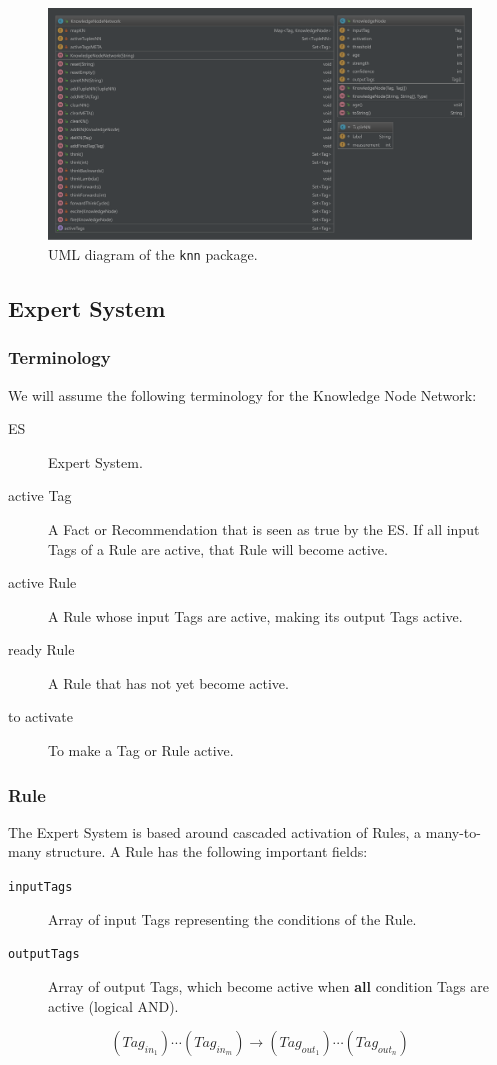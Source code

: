 \documentclass{beamer}
\newcommand{\code}[1]{\texttt{#1}}
\begin{document}
	\begin{frame}
		\begin{figure}
			\centering
			\includegraphics[width=\textwidth]{figures/uml_knn.pdf}
			\caption
			{UML diagram of the \code{knn} package.}
			\label{fig:uml_knn}
		\end{figure}
	\end{frame}
	
	\subsection{Expert System}
	
	\begin{frame}
		\frametitle{Terminology}
		We will assume the following terminology for the Knowledge Node Network:
		\begin{description}
			\item[ES] Expert System.
			\item[active Tag] A Fact or Recommendation that is seen as true by the ES. If all input Tags of a Rule are active, that Rule will become active.
			\item[active Rule] A Rule whose input Tags are active, making its output Tags active.
			\item[ready Rule] A Rule that has not yet become active.
			\item[to activate] To make a Tag or Rule active.
		\end{description}
	\end{frame}
	
	\begin{frame}
		\frametitle{Rule}
		The Expert System is based around cascaded activation of Rules, a many-to-many structure. A Rule has the following important fields:
		\begin{description}
			\item[\code{inputTags}] Array of input Tags representing the conditions of the Rule.
			\item[\code{outputTags}] Array of output Tags, which become active when \textbf{all} condition Tags are active (logical AND).
		\end{description}
	
		\begin{equation}
			(Tag_{in_1}) \cdots (Tag_{in_m}) \rightarrow (Tag_{out_1}) \cdots (Tag_{out_n})
		\end{equation}
	\end{frame}
\end{document}
